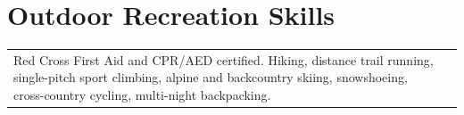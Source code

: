 \documentclass[10pt, letter]{article}
\newcommand\VRule{\color{lightgray}\vrule width 0.5pt}
\newcommand{\CC}{C\nolinebreak\hspace{-.05em}\raisebox{.4ex}{\tiny\bf +}\nolinebreak\hspace{-.10em}\raisebox{.4ex}{\tiny\bf +}}
\def\CC{{C\nolinebreak[4]\hspace{-.05em}\raisebox{.4ex}{\tiny\bf ++}}}
\begin{document}

   
\section*{Outdoor Recreation Skills}
\begin{tabular}{m{16cm}m{2.79cm}}
Red Cross First Aid and CPR/AED certified. Hiking, distance trail running, single-pitch sport climbing, alpine and backcountry skiing, snowshoeing, cross-country cycling, multi-night backpacking.
\end{tabular}

\end{document}
